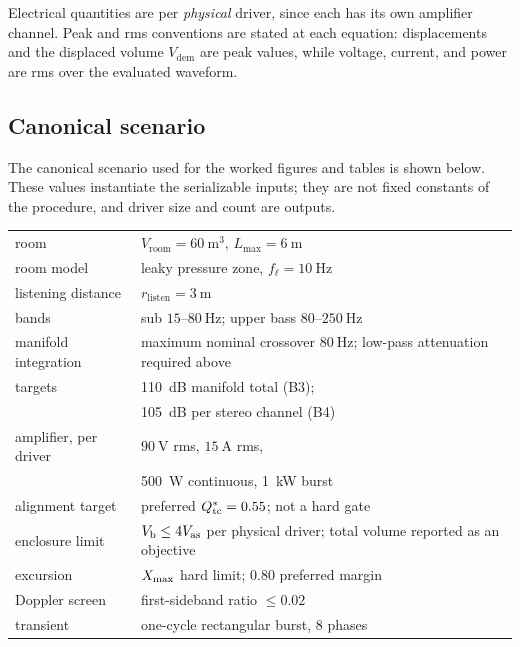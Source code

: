 Electrical quantities are per \emph{physical} driver, since each has its
own amplifier channel. Peak and rms conventions are stated at each
equation: displacements and the displaced volume $V_{\mathrm{dem}}$ are
peak values, while voltage, current, and power are rms over the evaluated
waveform.

\subsection{Canonical scenario}
\label{sec:scope-scenario}

The canonical scenario used for the worked figures and tables is shown
below. These values instantiate the serializable inputs; they are not fixed
constants of the procedure, and driver size and count are outputs.

\begin{center}
	\small
	\begin{tabular}{@{}p{2.5cm}p{5.0cm}@{}}
	\toprule
		room & $V_{\mathrm{room}}=\SI{60}{\cubic\meter}$,
			$L_{\max}=\SI{6}{\meter}$\\
		room model & leaky pressure zone,
			$f_\ell=\SI{10}{\hertz}$\\
		listening distance & $r_{\mathrm{listen}}=\SI{3}{\meter}$\\
		bands & sub $15$--$\SI{80}{\hertz}$;
			upper bass $80$--$\SI{250}{\hertz}$\\
		manifold integration & maximum nominal crossover
			$\SI{80}{\hertz}$; low-pass attenuation required above\\
		targets & \SI{110}{dB} manifold total (B3);\\
		 & \SI{105}{dB} per stereo channel (B4)\\
		amplifier, per driver & $\SI{90}{\volt}$ rms, $\SI{15}{\ampere}$ rms,\\
		 & \SI{500}{\watt} continuous, \SI{1}{\kilo\watt} burst\\
		alignment target & preferred $Q_{\mathrm{tc}}^\ast=0.55$; not a hard gate\\
		enclosure limit & $V_{\mathrm{b}}\le4V_{\mathrm{as}}$ per physical driver;
			total volume reported as an objective\\
		excursion & $X_{\mathrm{max}}$ hard limit;
			$0.80$ preferred margin\\
		Doppler screen & first-sideband ratio $\le0.02$\\
		transient & one-cycle rectangular burst, 8 phases\\
	\bottomrule
	\end{tabular}
\end{center}

